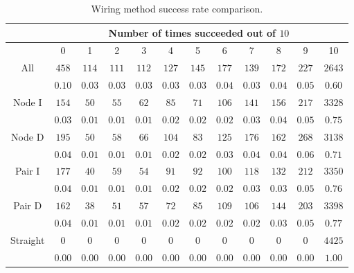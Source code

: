 \begin{table}[H]
\begin{center}
\begin{singlespace}
\begin{tabular}{|c||c|c|c|c|c|c|c|c|c|c|c|}
\hline
 & \multicolumn{11}{|c|}{Number of times succeeded out of $10$} \\
\hline
 & 0 & 1 & 2 & 3 & 4 & 5 & 6 & 7 & 8 & 9 & 10 \\
\hline\hline
All & $458$ & $114$ & $111$ & $112$ & $127$ & $145$ & $177$ & $139$ & $172$ & $227$ & $2643$ \\
 & $0.10$ & $0.03$ & $0.03$ & $0.03$ & $0.03$ & $0.03$ & $0.04$ & $0.03$ & $0.04$ & $0.05$ & $0.60$ \\
\hline
 Node I & $154$ & $50$ & $55$ & $62$ & $85$ & $71$ & $106$ & $141$ & $156$ & $217$ & $3328$ \\
  & $0.03$ & $0.01$ & $0.01$ & $0.01$ & $0.02$ & $0.02$ & $0.02$ & $0.03$ & $0.04$ & $0.05$ & $0.75$ \\
\hline
  Node D & $195$ & $50$ & $58$ & $66$ & $104$ & $83$ & $125$ & $176$ & $162$ & $268$ & $3138$ \\
   & $0.04$ & $0.01$ & $0.01$ & $0.01$ & $0.02$ & $0.02$ & $0.03$ & $0.04$ & $0.04$ & $0.06$ & $0.71$ \\
\hline
   Pair I & $177$ & $40$ & $59$ & $54$ & $91$ & $92$ & $100$ & $118$ & $132$ & $212$ & $3350$ \\
    & $0.04$ & $0.01$ & $0.01$ & $0.01$ & $0.02$ & $0.02$ & $0.02$ & $0.03$ & $0.03$ & $0.05$ & $0.76$ \\
\hline
    Pair D & $162$ & $38$ & $51$ & $57$ & $72$ & $85$ & $109$ & $106$ & $144$ & $203$ & $3398$ \\
     & $0.04$ & $0.01$ & $0.01$ & $0.01$ & $0.02$ & $0.02$ & $0.02$ & $0.02$ & $0.03$ & $0.05$ & $0.77$ \\
\hline
     Straight & $0$ & $0$ & $0$ & $0$ & $0$ & $0$ & $0$ & $0$ & $0$ & $0$ & $4425$ \\
      & $0.00$ & $0.00$ & $0.00$ & $0.00$ & $0.00$ & $0.00$ & $0.00$ & $0.00$ & $0.00$ & $0.00$ & $1.00$ \\
\hline
\end{tabular}
\end{singlespace}
\end{center}
\label{tb:wiring_success}
\caption[Wiring method success rate comparison]{Wiring method success rate
comparison.}
\end{table}

